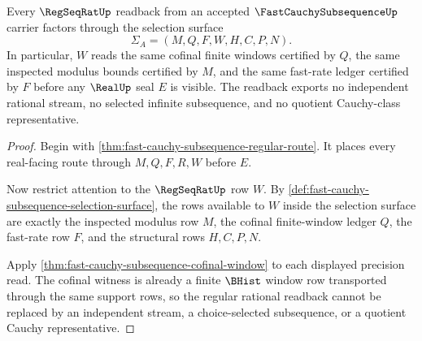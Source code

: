 \begin{theorem}
\label{thm:fast-cauchy-subsequence-regular-readback}
Every $\RegSeqRatUp$ readback from an accepted $\FastCauchySubsequenceUp$ carrier factors through the selection surface
$$
\Sigma_A=(M,Q,F,W,H,C,P,N).
$$
In particular, $W$ reads the same cofinal finite windows certified by $Q$, the same inspected modulus bounds certified by $M$, and the same fast-rate ledger certified by $F$ before any $\RealUp$ seal $E$ is visible. The readback exports no independent rational stream, no selected infinite subsequence, and no quotient Cauchy-class representative.
\end{theorem}
\begin{proof}
Begin with \autoref{thm:fast-cauchy-subsequence-regular-route}. It places every real-facing route through $M,Q,F,R,W$ before $E$.

Now restrict attention to the $\RegSeqRatUp$ row $W$. By \autoref{def:fast-cauchy-subsequence-selection-surface}, the rows available to $W$ inside the selection surface are exactly the inspected modulus row $M$, the cofinal finite-window ledger $Q$, the fast-rate row $F$, and the structural rows $H,C,P,N$.

Apply \autoref{thm:fast-cauchy-subsequence-cofinal-window} to each displayed precision read. The cofinal witness is already a finite $\BHist$ window row transported through the same support rows, so the regular rational readback cannot be replaced by an independent stream, a choice-selected subsequence, or a quotient Cauchy representative.
\end{proof}


